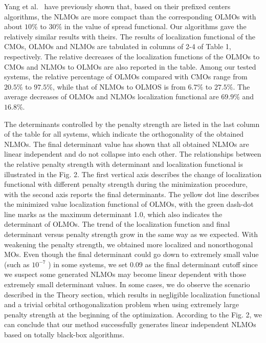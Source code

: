 \documentclass[aps,prl,reprint,amsmath,amssymb]{revtex4-1}
\begin{document}
Yang et al.~\cite{feng2004An_efficient, cui2010efficient} have previously shown that, based on their prefixed centers algorithms, the NLMOs are more compact than the corresponding OLMOs with about $10\%$ to $30\%$ in the value of spread functional.
Our algorithms gave the relatively similar results with theirs.
The results of localization functional of the CMOs, OLMOs and NLMOs are tabulated in columns of 2-4 of Table 1, respectively.
The relative decreases of the localization functions of the OLMOs to CMOs and NLMOs to OLMOs are also reported in the table.
Among our tested systems, the relative percentage of OLMOs compared with CMOs range from $20.5\%$ to $97.5\%$, while that of NLMOs to OLMOS is from $6.7\%$ to $27.5\%$.
The average decreases of OLMOs and NLMOs localization functional are $69.9\%$ and $16.8\%$.

The determinants controlled by the penalty strength are listed in the last column of the table for all systems, which indicate the orthogonality of the obtained NLMOs.
The final determinant value has shown that all obtained NLMOs are linear independent and do not collapse into each other.
The relationships between the relative penalty strength with determinant and localization functional is illustrated in the Fig. 2.
The first vertical axis describes the change of localization functional with different penalty strength during the minimization procedure, with the second axis reports the final determinants.
The yellow dot line describes the minimized value localization functional of OLMOs, with the green dash-dot line marks as the maximum determinant 1.0, which also indicates the determinant of OLMOs.
The trend of the localization function and final determinant versus penalty strength grow in the same way as we expected.
With weakening the penalty strength, we obtained more localized and nonorthogonal MOs.
Even though the final determinant could go down to extremely small value (such as $10^{-7}$ ) in some systems, we set 0.09 as the final determinant cutoff since we suspect some generated NLMOs may become linear dependent with those extremely small determinant values.
In some cases, we do observe the scenario described in the Theory section, which results in negligible localization functional and a trivial orbital orthogonalization problem when using extremely large penalty strength at the beginning of the optimization.
According to the Fig. 2, we can conclude that our method successfully generates linear independent NLMOs based on totally black-box algorithms.
\end{document}
